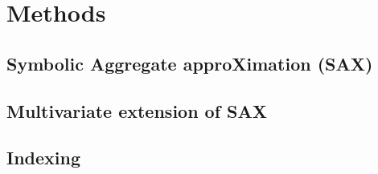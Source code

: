 \chapter{Methods}

\section{Symbolic Aggregate approXimation (SAX)}

\section{Multivariate extension of SAX}

\section{Indexing}